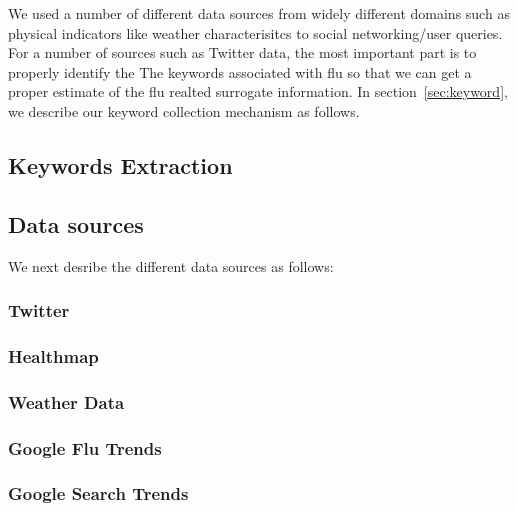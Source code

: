 We used a number of different data sources from widely different domains
such as physical indicators like weather characterisitcs to social
networking/user queries. For a number of sources such as Twitter data,
the most important part is to properly identify the The keywords
associated with flu so that we can get a proper estimate of the flu
realted surrogate information. In section~\ref{sec:keyword}, we describe
our keyword collection mechanism as follows.
\subsection{\label{sec:keyword} Keywords Extraction}


\subsection{Data sources}
We next desribe the different data sources as follows: 
\subsubsection{Twitter} 
\subsubsection{Healthmap}
\subsubsection{Weather Data}
\subsubsection{Google Flu Trends}
\subsubsection{Google Search Trends}
